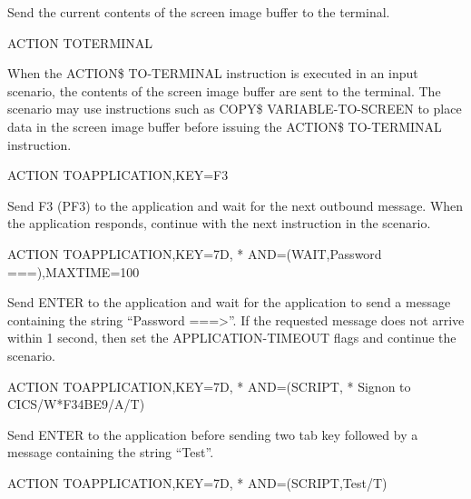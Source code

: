 \documentclass[letterpaper,10pt,english]{sphinxmanual}
\begin{document}

Send the current contents of the screen image buffer to the terminal.

\begin{sphinxVerbatim}[commandchars=\\\{\}]
ACTION\PYGZdl{} TO\PYGZhy{}TERMINAL
\end{sphinxVerbatim}

When the ACTION\$ TO-TERMINAL instruction is executed in an input scenario, the contents of the screen image buffer
are sent to the terminal. The scenario may use instructions such as COPY\$ VARIABLE-TO-SCREEN to place data in the
screen image buffer before issuing the ACTION\$ TO-TERMINAL instruction.


\begin{sphinxVerbatim}[commandchars=\\\{\}]
ACTION\PYGZdl{} TO\PYGZhy{}APPLICATION,KEY=F3
\end{sphinxVerbatim}

Send F3 (PF3) to the application and wait for the next outbound message. When the application responds, continue with the next instruction in the scenario.

\begin{sphinxVerbatim}[commandchars=\\\{\}]
ACTION\PYGZdl{} TO\PYGZhy{}APPLICATION,KEY=7D, *
AND=(WAIT,\PYGZsq{}Password ===\PYGZgt{}\PYGZsq{}),MAXTIME=100
\end{sphinxVerbatim}

Send ENTER to the application and wait for the application to send a message containing the string “Password ===\textgreater{}”. If the requested message does not arrive within 1 second, then set the APPLICATION-TIMEOUT flags and continue the scenario.

\begin{sphinxVerbatim}[commandchars=\\\{\}]
ACTION\PYGZdl{} TO\PYGZhy{}APPLICATION,KEY=7D, *
AND=(SCRIPT, *
\PYGZsq{}Signon to CICS\PYGZam{}\PYGZam{}/W\PYGZam{}\PYGZam{}*F34BE9\PYGZam{}\PYGZam{}/A\PYGZam{}\PYGZam{}/T\PYGZsq{})
\end{sphinxVerbatim}

Send ENTER to the application before sending two tab key followed by a message containing the string “Test”.

\begin{sphinxVerbatim}[commandchars=\\\{\}]
ACTION\PYGZdl{} TO\PYGZhy{}APPLICATION,KEY=7D, *
AND=(SCRIPT,\PYGZsq{}\PYGZam{}\PYGZam{}\PYGZgt{}\PYGZam{}\PYGZam{}\PYGZgt{}Test\PYGZam{}\PYGZam{}/T\PYGZsq{})
\end{sphinxVerbatim}
\end{document}
